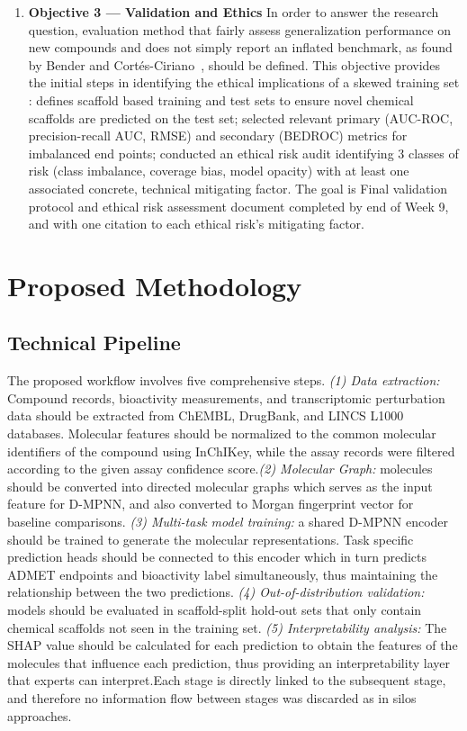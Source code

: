 \documentclass[conference]{IEEEtran}
\begin{document}
\begin{enumerate}
\item \textbf{Objective 3 --- Validation and Ethics}  In order to answer the research question, evaluation method that fairly assess generalization performance on new compounds and does not simply report an inflated benchmark, as found by Bender and Cort\'{e}s-Ciriano~\cite{b4}, should be defined. This objective provides the initial steps in identifying the ethical implications of a skewed training set \cite{b10}: defines scaffold based training and test sets \cite{b5} to ensure novel chemical scaffolds are predicted on the test set; selected relevant primary (AUC-ROC, precision-recall AUC, RMSE) and secondary (BEDROC) metrics for imbalanced end points; conducted an ethical risk audit identifying 3 classes of risk (class imbalance, coverage bias, model opacity) with at least one associated concrete, technical mitigating factor. The goal is Final validation protocol and ethical risk assessment document completed by end of Week 9, and with one citation to each ethical risk's mitigating factor.

\end{enumerate}

\section{Proposed Methodology} 
\subsection{Technical Pipeline}
The proposed workflow involves five comprehensive
steps. \textit{(1) Data extraction:} Compound records, bioactivity measurements, and transcriptomic perturbation data should be extracted  from ChEMBL, DrugBank, and LINCS L1000 databases. Molecular features should be normalized to the common molecular identifiers of the compound using InChIKey, while the assay records were filtered according to the given assay confidence score.\textit{(2) Molecular Graph:} molecules should be converted into directed molecular graphs which serves as the input feature for D-MPNN, and also converted to Morgan fingerprint vector for baseline comparisons. \textit{(3) Multi-task model training:} a shared D-MPNN encoder should be trained to generate the molecular representations. Task specific prediction heads should be connected to this encoder which in turn predicts ADMET endpoints and bioactivity label simultaneously, thus maintaining the relationship between the two predictions. \textit{(4) Out-of-distribution validation:} models should be evaluated in scaffold-split hold-out sets that only contain chemical scaffolds not seen in the training set\cite{b5}. \textit{(5) Interpretability analysis:} The SHAP value should be calculated for each prediction to obtain the features of the molecules that influence each prediction, thus providing an interpretability layer that experts can interpret\cite{b7}.Each stage is directly linked to the subsequent stage, and therefore no information flow between stages was discarded as in silos approaches\cite{b3}.
 
\end{document}
